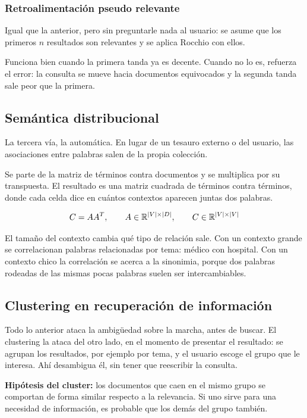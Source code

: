 \documentclass[11pt,letterpaper]{article}
\begin{document}
\subsubsection*{Retroalimentación pseudo relevante}

Igual que la anterior, pero sin preguntarle nada al usuario: se asume
que los primeros $n$ resultados son relevantes y se aplica Rocchio con
ellos.

Funciona bien cuando la primera tanda ya es decente. Cuando no lo es,
refuerza el error: la consulta se mueve hacia documentos equivocados y
la segunda tanda sale peor que la primera.

\subsection*{Semántica distribucional}

La tercera vía, la automática. En lugar de un tesauro externo o del
usuario, las asociaciones entre palabras salen de la propia colección.

Se parte de la matriz de términos contra documentos y se multiplica por
su transpuesta. El resultado es una matriz cuadrada de términos contra
términos, donde cada celda dice en cuántos contextos aparecen juntas
dos palabras.

\[
    C = A A^{T},
    \qquad
    A \in \mathbb{R}^{|V| \times |D|},
    \qquad
    C \in \mathbb{R}^{|V| \times |V|}
\]

\begin{idea}
    El tamaño del contexto cambia qué tipo de relación sale. Con un
    contexto grande se correlacionan palabras relacionadas por tema:
    médico con hospital. Con un contexto chico la correlación se acerca
    a la sinonimia, porque dos palabras rodeadas de las mismas pocas
    palabras suelen ser intercambiables.
\end{idea}

\subsection*{Clustering en recuperación de información}

Todo lo anterior ataca la ambigüedad sobre la marcha, antes de buscar.
El clustering la ataca del otro lado, en el momento de presentar el
resultado: se agrupan los resultados, por ejemplo por tema, y el
usuario escoge el grupo que le interesa. Ahí desambigua él, sin tener
que reescribir la consulta.

\begin{idea}
    \textbf{Hipótesis del cluster:} los documentos que caen en el mismo
    grupo se comportan de forma similar respecto a la relevancia. Si
    uno sirve para una necesidad de información, es probable que los
    demás del grupo también.
\end{idea}
\end{document}
